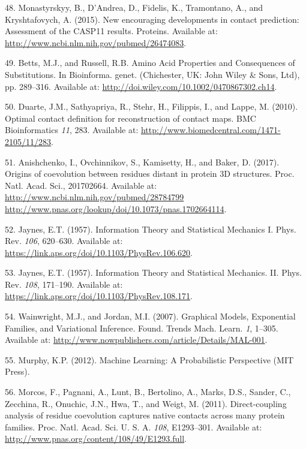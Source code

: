 \documentclass[12pt,a4paper,twoside]{book}
\theoremstyle{definition}
\theoremstyle{definition}
\theoremstyle{remark}
\begin{document}
\hypertarget{ref-Monastyrskyy2015}{}
48. Monastyrskyy, B., D'Andrea, D., Fidelis, K., Tramontano, A., and
Kryshtafovych, A. (2015). New encouraging developments in contact
prediction: Assessment of the CASP11 results. Proteins. Available at:
\url{http://www.ncbi.nlm.nih.gov/pubmed/26474083}.

\hypertarget{ref-Bettsa}{}
49. Betts, M.J., and Russell, R.B. Amino Acid Properties and
Consequences of Substitutions. In Bioinforma. genet. (Chichester, UK:
John Wiley \& Sons, Ltd), pp. 289--316. Available at:
\url{http://doi.wiley.com/10.1002/0470867302.ch14}.

\hypertarget{ref-Duarte2010}{}
50. Duarte, J.M., Sathyapriya, R., Stehr, H., Filippis, I., and Lappe,
M. (2010). Optimal contact definition for reconstruction of contact
maps. BMC Bioinformatics \emph{11}, 283. Available at:
\url{http://www.biomedcentral.com/1471-2105/11/283}.

\hypertarget{ref-Anishchenko2017}{}
51. Anishchenko, I., Ovchinnikov, S., Kamisetty, H., and Baker, D.
(2017). Origins of coevolution between residues distant in protein 3D
structures. Proc. Natl. Acad. Sci., 201702664. Available at:
\href{http://www.ncbi.nlm.nih.gov/pubmed/28784799\%20http://www.pnas.org/lookup/doi/10.1073/pnas.1702664114}{http://www.ncbi.nlm.nih.gov/pubmed/28784799 http://www.pnas.org/lookup/doi/10.1073/pnas.1702664114}.

\hypertarget{ref-Jaynes1957a}{}
52. Jaynes, E.T. (1957). Information Theory and Statistical Mechanics I.
Phys. Rev. \emph{106}, 620--630. Available at:
\url{https://link.aps.org/doi/10.1103/PhysRev.106.620}.

\hypertarget{ref-Jaynes1957b}{}
53. Jaynes, E.T. (1957). Information Theory and Statistical Mechanics.
II. Phys. Rev. \emph{108}, 171--190. Available at:
\url{https://link.aps.org/doi/10.1103/PhysRev.108.171}.

\hypertarget{ref-Wainwright2007}{}
54. Wainwright, M.J., and Jordan, M.I. (2007). Graphical Models,
Exponential Families, and Variational Inference. Found. Trends Mach.
Learn. \emph{1}, 1--305. Available at:
\url{http://www.nowpublishers.com/article/Details/MAL-001}.

\hypertarget{ref-Murphy2012}{}
55. Murphy, K.P. (2012). Machine Learning: A Probabilistic Perspective
(MIT Press).

\hypertarget{ref-Morcos2011}{}
56. Morcos, F., Pagnani, A., Lunt, B., Bertolino, A., Marks, D.S.,
Sander, C., Zecchina, R., Onuchic, J.N., Hwa, T., and Weigt, M. (2011).
Direct-coupling analysis of residue coevolution captures native contacts
across many protein families. Proc. Natl. Acad. Sci. U. S. A.
\emph{108}, E1293--301. Available at:
\url{http://www.pnas.org/content/108/49/E1293.full}.
\end{document}

